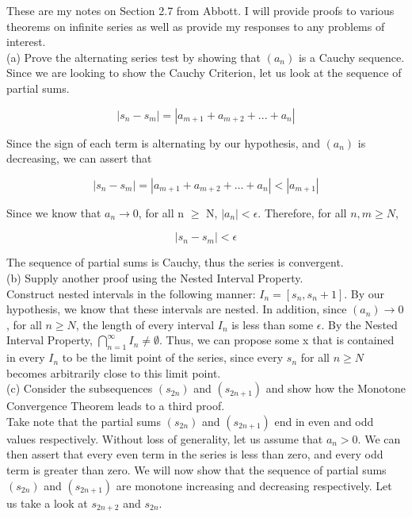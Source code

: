 \documentclass{article}
\begin{document}
These are my notes on Section 2.7 from Abbott. I will provide proofs to various theorems on infinite series as well as provide my responses to any problems of interest. \\

(a) Prove the alternating series test by showing that $(a_n)$ is a Cauchy sequence. \\

Since we are looking to show the Cauchy Criterion, let us look at the sequence of partial sums. 

\begin{equation}
    |s_n - s_m| = |a_{m+1} + a_{m+2} + ... + a_n|
\end{equation}

Since the sign of each term is alternating by our hypothesis, and $(a_n)$ is decreasing, we can assert that 

\begin{equation}
    |s_n - s_m| = |a_{m+1} + a_{m+2} + ... + a_n| < |a_{m+1}|
\end{equation}

Since we know that $a_n \rightarrow 0$, for all n $\ge$ N, $|a_n| < \epsilon$. Therefore, for all $n, m \ge N$,

\begin{equation}
    |s_n - s_m| < \epsilon
\end{equation}

The sequence of partial sums is Cauchy, thus the series is convergent. \\

(b) Supply another proof using the Nested Interval Property. \\

Construct nested intervals in the following manner: $I_n = [s_n, s_n+1]$. By our hypothesis, we know that these intervals are nested. In addition, since $(a_n) \rightarrow 0$, for all $n \ge N$, the length of every interval $I_n$ is less than some $\epsilon$. By the Nested Interval Property, ${\bigcap}_{n=1}^\infty I_n \neq \emptyset$. Thus, we can propose some x that is contained in every $I_n$ to be the limit point of the series, since every $s_n$ for all $n \ge N$ becomes arbitrarily close to this limit point. \\

(c) Consider the subsequences $(s_{2n})$ and $(s_{2n+1})$ and show how the Monotone Convergence Theorem leads to a third proof. \\

Take note that the partial sums $(s_{2n})$ and $(s_{2n+1})$ end in even and odd values respectively. Without loss of generality, let us assume that $a_n > 0$. We can then assert that every even term in the series is less than zero, and every odd term is greater than zero. We will now show that the sequence of partial sums $(s_{2n})$ and $(s_{2n+1})$ are monotone increasing and decreasing respectively. Let us take a look at $s_{2n+2}$ and $s_{2n}$. 
\end{document}

